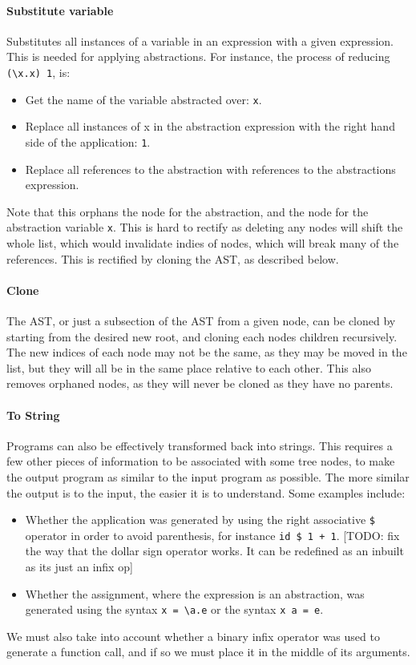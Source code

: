 \paragraph{Substitute variable} Substitutes all instances of a variable in an expression with a given expression. This is needed for applying abstractions. For instance, the process of reducing \verb|(\x.x) 1|, is:
\begin{itemize}
    \item Get the name of the variable abstracted over: \verb|x|.
    \item Replace all instances of x in the abstraction expression with the right hand side of the application: \verb|1|.
    \item Replace all references to the abstraction with references to the abstractions expression. 
\end{itemize}

Note that this orphans the node for the abstraction, and the node for the abstraction variable \verb|x|. This is hard to rectify as deleting any nodes will shift the whole list, which would invalidate indies of nodes, which will break many of the references. This is rectified by cloning the AST, as described below.

\paragraph{Clone} The AST, or just a subsection of the AST from a given node, can be cloned by starting from the desired new root, and cloning each nodes children recursively. The new indices of each node may not be the same, as they may be moved in the list, but they will all be in the same place relative to each other. This also removes orphaned nodes, as they will never be cloned as they have no parents. 

\paragraph{To String} \label{paragraph:to_string} Programs can also be effectively transformed back into strings. This requires a few other pieces of information to be associated with some tree nodes, to make the output program as similar to the input program as possible. The more similar the output is to the input, the easier it is to understand. Some examples include:
\begin{itemize}
    \item Whether the application was generated by using the right associative \verb|$| operator in order to avoid parenthesis, for instance \verb|id $ 1 + 1|. [TODO: fix the way that the dollar sign operator works. It can be redefined as an inbuilt as its just an infix op]
    \item Whether the assignment, where the expression is an abstraction, was generated using the syntax \verb|x = \a.e| or the syntax \verb|x a = e|. 
\end{itemize}
We must also take into account whether a binary infix operator was used to generate a function call, and if so we must place it in the middle of its arguments. 

